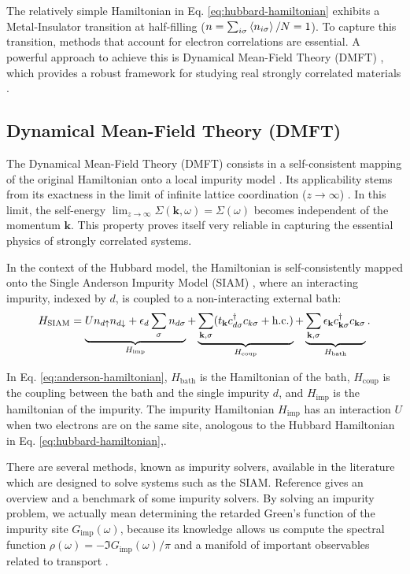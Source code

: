 \documentclass[12pt]{report}
\begin{document}
The relatively simple Hamiltonian in Eq. \eqref{eq:hubbard-hamiltonian} exhibits a Metal-Insulator transition at half-filling ($n = \sum_{i\sigma} \ev{n_{i\sigma}} / N = 1$). To capture this transition, methods that account for electron correlations are essential. A powerful approach to achieve this is Dynamical Mean-Field Theory (DMFT) \cite{georges1996}, which provides a robust framework for studying real strongly correlated materials \cite{haule_real_materials}.

\subsection{Dynamical Mean-Field Theory (DMFT)} \label{sec:dmft}

The Dynamical Mean-Field Theory (DMFT) consists in a self-consistent mapping of the original Hamiltonian onto a local impurity model \cite{thesis_dmft_graz}. Its applicability stems from its exactness in the limit of infinite lattice coordination ($z \to \infty$) \cite{georges1996}. In this limit, the self-energy $\displaystyle{\lim_{z \to \infty}\Sigma(\mathbf{k},\omega) = \Sigma(\omega)}$ becomes independent of the momentum $\mathbf{k}$. This property proves itself very reliable in capturing the essential physics of strongly correlated systems.

In the context of the Hubbard model, the Hamiltonian is self-consistently mapped onto the Single Anderson Impurity Model (SIAM) \cite{impurity-solvers, georges1996}, where an interacting impurity, indexed by $d$, is coupled to a non-interacting external bath:
\begin{equation} \label{eq:anderson-hamiltonian}
H_{\text{SIAM}} = \underbrace{U n_{d{\uparrow}} n_{d{\downarrow}} + \epsilon_d \sum_{{\sigma}} n_{d{\sigma}}}_{H_{\text{imp}}}
+ \underbrace{\sum_{{\vb{k}},{\sigma}} (t_{\vb{k}} c_{d{\sigma}}^\dagger c_{k{\sigma}} + {\text{h.c.}})}_{H_{\text{coup}}}
+ \underbrace{\sum_{{\vb{k}},{\sigma}} \epsilon_{\vb{k}} c_{{\vb{k}}{\sigma}}^\dagger c_{{\vb{k}}{\sigma}}}_{H_{\text{bath}}}.
\end{equation}

In Eq. \eqref{eq:anderson-hamiltonian}, $H_{\text{bath}}$ is the Hamiltonian of the bath, $H_{\text{coup}}$ is the coupling between the bath and the single impurity $d$, and $H_{\text{imp}}$ is the hamiltonian of the impurity. The impurity Hamiltonian $H_{\text{imp}}$  has an interaction $U$ when two electrons are on the same site, anologous to the Hubbard Hamiltonian in Eq. \eqref{eq:hubbard-hamiltonian},.

There are several methods, known as impurity solvers, available in the literature which are designed to solve systems such as the SIAM. Reference \cite{impurity-solvers} gives an overview and a benchmark of some impurity solvers. By solving an impurity problem, we actually mean determining the retarded Green's function of the impurity site $G_{\text{imp}}(\omega)$, because its knowledge allows us compute the spectral function $\displaystyle{\rho(\omega) = - \Im{G_{\text{imp}}(\omega)}} / \pi$ and a manifold of important observables related to transport \cite{pedagogical-gfs}.
\end{document}
